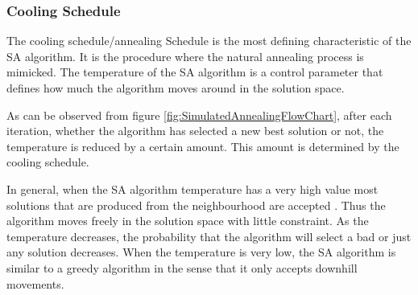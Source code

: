 
\subsubsection{Cooling Schedule}
The cooling schedule/annealing Schedule is the most defining characteristic of the SA algorithm. It is the procedure where the natural annealing process is mimicked. The temperature of the SA algorithm is a control parameter that defines how much the algorithm moves around in the solution space.

As can be observed from figure \ref{fig:SimulatedAnnealingFlowChart}, after each iteration, whether the algorithm has selected a new best solution or not, the temperature is reduced by a certain amount. This amount is determined by the cooling schedule.

In general, when the SA algorithm temperature has a very high value most solutions that are produced from the neighbourhood are accepted \cite{ClusterSA}. Thus the algorithm moves freely in the solution space with little constraint. As the temperature decreases, the probability that the algorithm will select a bad or just any solution decreases. When the temperature is very low, the SA algorithm is similar to a greedy algorithm in the sense that it only accepts downhill movements\cite{ClusterSA}.

